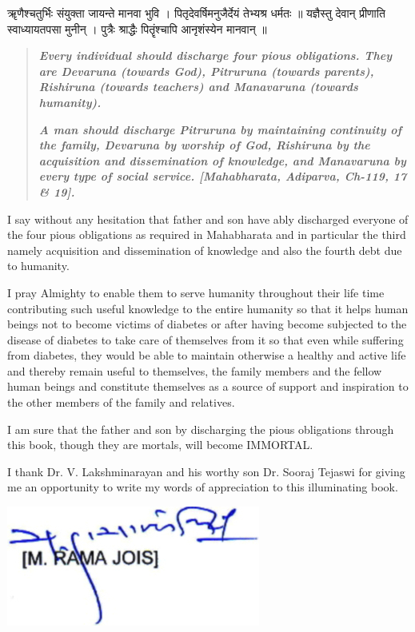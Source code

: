 ॠणैश्चतुर्भिः संयुक्ता जायन्ते मानवा भुवि ।
पितृदेवर्षिमनुजैर्देयं तेभ्यश्र धर्मतः ॥
यज्ञैस्तु देवान् प्रीणाति स्वाध्यायतपसा मुनीन् ।
पुत्रैः श्राद्धैः पितॄंश्चापि आनृशंस्येन मानवान् ॥

\begin{quote}
\textit{\textbf{Every individual should discharge four pious obligations. They are Devaruna (towards God), Pitruruna (towards parents), Rishiruna (towards teachers) and Manavaruna (towards humanity).}}

\textit{\textbf{A man should discharge Pitruruna by maintaining continuity of the family, Devaruna by worship of God, Rishiruna by the acquisition and dissemination of knowledge, and Manavaruna by every type of social service. [Mahabharata, Adiparva, Ch-119, 17 \& 19].}}
\end{quote}

I say without any hesitation that father and son have ably discharged everyone of the four pious obligations as required in Mahabharata and in particular the third namely acquisition and dissemination of knowledge and also the fourth debt due to humanity.

I pray Almighty to enable them to serve humanity throughout their life time contributing such useful knowledge to the entire humanity so that it helps human beings not to become victims of diabetes or after having become subjected to the disease of diabetes to take care of themselves from it so that even while suffering from diabetes, they would be able to maintain otherwise a healthy and active life and thereby remain useful to themselves, the family members and the fellow human beings and constitute themselves as a source of support and inspiration to the other members of the family and relatives.

I am sure that the father and son by discharging the pious obligations through this book, though they are mortals, will become IMMORTAL.

I thank Dr. V. Lakshminarayan and his worthy son Dr. Sooraj Tejaswi for giving me an opportunity to write my words of appreciation to this illuminating book.

\begin{flushright}
\includegraphics[scale=2]{images/003a.jpg}
\end{flushright}

